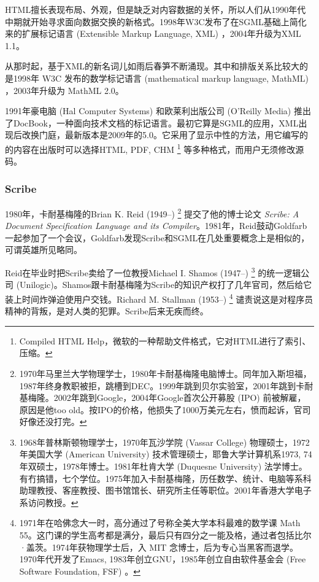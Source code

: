 HTML擅长表现布局、外观，但是缺乏对内容数据的关怀，所以人们从1990年代中期就开始寻求面向数据交换的新格式。1998年W3C发布了在SGML基础上简化来的扩展标记语言 (Extensible Markup Language, XML) ，2004年升级为XML 1.1。

从那时起，基于XML的新名词儿如雨后春笋不断涌现。其中和排版关系比较大的是1998年  W3C 发布的数学标记语言 (mathematical markup language, MathML) ，2003年升级为 MathML 2.0。

1991年豪电脑 (Hal Computer Systems)\indexHal{} 和欧莱利出版公司 (O'Reilly Media)\indexOreilly{} 推出了DocBook，一种面向技术文档的标记语言。最初它算是SGML的应用，XML出现后改换门庭，最新版本是2009年的5.0。它采用了显示中性的方法，用它编写的的内容在出版时可以选择HTML, PDF, CHM \footnote{Compiled HTML Help，微软的一种帮助文件格式，它对HTML进行了索引、压缩。} 等多种格式，而用户无须修改源码。

\subsubsection{Scribe}

1980年，卡耐基梅隆的Brian K. Reid (1949--)\indexReid{} \footnote{1970年马里兰大学物理学士，1980年卡耐基梅隆电脑博士。同年加入斯坦福，1987年终身教职被拒，跳槽到DEC。1999年跳到贝尔实验室\indexBell{}，2001年跳到卡耐基梅隆。2002年跳到Google，2004年Google首次公开募股 (IPO) 前被解雇，原因是他too old。按IPO的价格，他损失了1000万美元左右，愤而起诉，官司好像还没打完。} 提交了他的博士论文 \emph{Scribe: A Document Specification Language and its Compiler}。1981年，Reid鼓动Goldfarb一起参加了一个会议，Goldfarb发现Scribe和SGML在几处重要概念上是相似的，可谓英雄所见略同。

Reid在毕业时把Scribe卖给了一位教授Michael I. Shamos (1947--)\indexShamos{}  \footnote{1968年普林斯顿物理学士，1970年瓦沙学院 (Vassar College) 物理硕士，1972年美国大学 (American University) 技术管理硕士，耶鲁大学计算机系1973, 74年双硕士，1978年博士。1981年杜肯大学 (Duquesne University) 法学博士。有冇搞错，七个学位。1975年加入卡耐基梅隆，历任数学、统计、电脑等系科助理教授、客座教授、图书馆馆长、研究所主任等职位。2001年香港大学电子系访问教授。} 的统一逻辑公司 (Unilogic)\indexUnilogic{}。Shamos跟卡耐基梅隆为Scribe的知识产权打了几年官司，然后给它装上时间炸弹迫使用户交钱。Richard M. Stallman (1953--)\indexStallman{} \footnote{1971年在哈佛念大一时，高分通过了号称全美大学本科最难的数学课 Math 55。这门课的学生高考都是满分，最后只有四分之一能及格，通过者包括比尔·盖茨。1974年获物理学士后，入 MIT 念博士，后为专心当黑客而退学。1970年代开发了Emacs, 1983年创立GNU，1985年创立自由软件基金会 (Free Software Foundation, FSF) 。} 谴责说这是对程序员精神的背叛，是对人类的犯罪。Scribe后来无疾而终。

